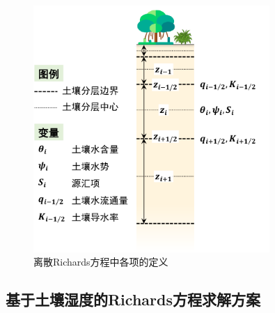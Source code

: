 {
\begin{figure}[htb]
\centering
\includegraphics[width=0.8\textwidth]{Figures/植被冠层和土壤水分/土壤水离散.pdf}
\caption{离散Richards方程中各项的定义}
\label{fig:土壤水离散}
\end{figure}
}

\subsection{基于土壤湿度的Richards方程求解方案}

